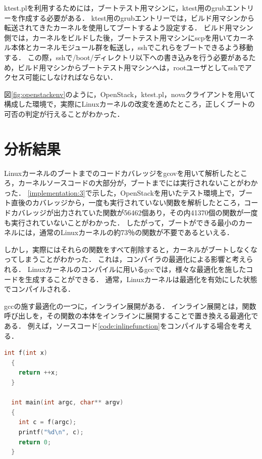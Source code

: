 \documentclass[graduation-thesis]{mlarticle}
\begin{document}
ktest.plを利用するためには，ブートテスト用マシンに，ktest用のgrubエントリーを作成する必要がある．
ktest用のgrubエントリーでは，ビルド用マシンから転送されてきたカーネルを使用してブートするよう設定する．
ビルド用マシン側では，カーネルをビルドした後，ブートテスト用マシンにscpを用いてカーネル本体とカーネルモジュール群を転送し，sshでこれらをブートできるよう移動する．
この際，sshで/boot/ディレクトリ以下への書き込みを行う必要があるため，ビルド用マシンからブートテスト用マシンへは，rootユーザとしてsshでアクセス可能にしなければならない．

図\ref{fig:openstackenv}のように，OpenStack，ktest.pl，novaクライアントを用いて構成した環境で，実際にLinuxカーネルの改変を進めたところ，正しくブートの可否の判定が行えることがわかった．

\clearpage
\section{分析結果}
\label{result}

Linuxカーネルのブートまでのコードカバレッジをgcovを用いて解析したところ，カーネルソースコードの大部分が，ブートまでには実行されないことがわかった．
\ref{implementation:3}で示した，OpenStackを用いたテスト環境上で，ブート直後のカバレッジから，一度も実行されていない関数を解析したところ，コードカバレッジが出力されていた関数が56462個あり，その内41370個の関数が一度も実行されていないことがわかった．
したがって，ブートができる最小のカーネルには，通常のLinuxカーネルの約73％の関数が不要であるといえる．

しかし，実際にはそれらの関数をすべて削除すると，カーネルがブートしなくなってしまうことがわかった．
これは，コンパイラの最適化による影響と考えられる．
Linuxカーネルのコンパイルに用いるgccでは，様々な最適化を施したコードを生成することができる．
通常，Linuxカーネルは最適化を有効にした状態でコンパイルされる．

gccの施す最適化の一つに，インライン展開がある．
インライン展開とは，関数呼び出しを，その関数の本体をインラインに展開することで置き換える最適化である．
例えば，ソースコード\ref{code:inlinefunction}をコンパイルする場合を考える．

\begin{lstlisting}[language=C, caption=インライン展開のコード例, label=code:inlinefunction]
  int f(int x)
  {
    return ++x;
  }

  int main(int argc, char** argv)
  {
    int c = f(argc);
    printf("%d\n", c);
    return 0;
  }
\end{lstlisting}
\end{document}
